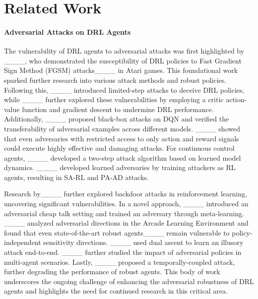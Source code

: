 \section{Related Work}
\paragraph{Adversarial Attacks on DRL Agents}
The vulnerability of DRL agents to adversarial attacks was first highlighted by ____, who demonstrated the susceptibility of DRL policies to Fast Gradient Sign Method (FGSM) attacks____ in Atari games. This foundational work sparked further research into various attack methods and robust policies.
Following this, ____ introduced limited-step attacks to deceive DRL policies,
while ____ further explored these vulnerabilities by employing a critic action-value function and gradient descent to undermine DRL performance.
Additionally, ____ proposed black-box attacks on DQN and verified the transferability of adversarial examples across different models.
____ showed that even adversaries with restricted access to only action and reward signals could execute highly effective and damaging attacks. 
For continuous control agents, ____ developed a two-step attack algorithm based on learned model dynamics.
____ developed learned adversaries by training attackers as RL agents, resulting in SA-RL and PA-AD attacks. 

Research by____ further explored backdoor attacks in reinforcement learning, uncovering significant vulnerabilities.
In a novel approach, ____ introduced an adversarial cheap talk setting and trained an adversary through meta-learning. 
____ analyzed adversarial directions in the Arcade Learning Environment and found that even state-of-the-art robust agents____ remain vulnerable to policy-independent sensitivity directions.
____ used dual ascent to learn an illusory attack end-to-end.
____ further studied the impact of adversarial policies in multi-agent scenarios.
Lastly, ____ proposed a temporally-coupled attack, further degrading the performance of robust agents.
This body of work underscores the ongoing challenge of enhancing the adversarial robustness of DRL agents and highlights the need for continued research in this critical area.

